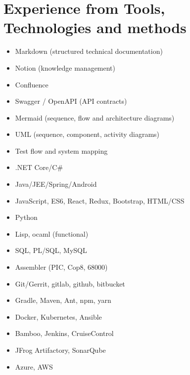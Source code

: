 \section{Experience from Tools, Technologies and methods}
\begin{cvcolumns}
{\begin{itemize}
    \item Markdown (structured technical documentation)
    \item Notion (knowledge management)
    \item Confluence
    \item Swagger / OpenAPI (API contracts)
\end{itemize}}
{\begin{itemize}
    \item Mermaid (sequence, flow and architecture diagrams)
    \item UML (sequence, component, activity diagrams)
    \item Test flow and system mapping
\end{itemize}}
\end{cvcolumns}
\begin{cvcolumns}
        {\begin{itemize}
            \item .NET Core/C\#
            \item Java/JEE/Spring/Android
            \item JavaScript, ES6, React, Redux, Bootstrap, HTML/CSS
            \item Python
            \item Lisp, ocaml  (functional)
            \item SQL, PL/SQL, MySQL
            \item Assembler (PIC, Cop8, 68000)
        \end{itemize}}
	{\begin{itemize}
        \item Git/Gerrit, gitlab, github, bitbucket
        \item Gradle, Maven, Ant, npm, yarn
        \item Docker, Kubernetes, Ansible
        \item Bamboo, Jenkins, CruiseControl
        \item JFrog Artifactory, SonarQube
        \item Azure, AWS
    \end{itemize}}
\end{cvcolumns}
